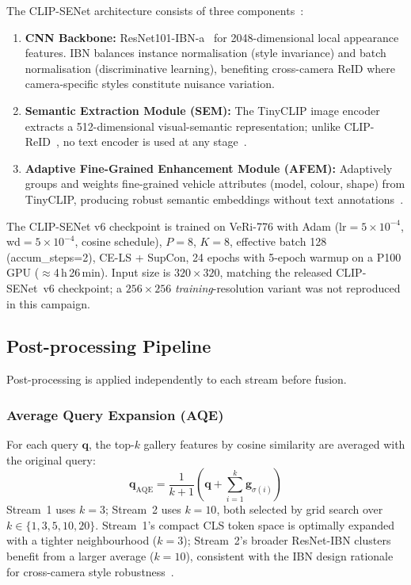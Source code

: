 \documentclass[11pt]{article}
\begin{document}
The CLIP-SENet architecture consists of three components~\cite{lu2025clipsenet}:
\begin{enumerate}
  \item \textbf{CNN Backbone:} ResNet101-IBN-a~\cite{pan2018ibn} for
    2048-dimensional local appearance features. IBN balances instance
    normalisation (style invariance) and batch normalisation (discriminative
    learning), benefiting cross-camera ReID where camera-specific styles
    constitute nuisance variation.
  \item \textbf{Semantic Extraction Module (SEM):} The TinyCLIP image encoder
    extracts a 512-dimensional visual-semantic representation; unlike
    CLIP-ReID~\cite{li2023clipreid}, no text encoder is used at any
    stage~\cite{lu2025clipsenet}.
  \item \textbf{Adaptive Fine-Grained Enhancement Module (AFEM):} Adaptively
    groups and weights fine-grained vehicle attributes (model, colour, shape)
    from TinyCLIP, producing robust semantic embeddings without text
    annotations~\cite{lu2025clipsenet}.
\end{enumerate}

The CLIP-SENet v6 checkpoint is trained on VeRi-776 with Adam
($\mathrm{lr}\!=\!5\!\times\!10^{-4}$, wd$=\!5\!\times\!10^{-4}$, cosine
schedule), $P\!=\!8$, $K\!=\!8$, effective batch 128 (accum\_steps=2), CE-LS
+ SupCon, 24 epochs with 5-epoch warmup on a P100 GPU ($\approx$4\,h\,26\,min).
Input size is $320\!\times\!320$, matching the released CLIP-SENet~v6
checkpoint; a $256\!\times\!256$ \emph{training}-resolution variant was not
reproduced in this campaign.

\subsection{Post-processing Pipeline}
Post-processing is applied independently to each stream before fusion.

\subsubsection{Average Query Expansion (AQE)~\cite{arandjelovic2012aqe}}
For each query $\mathbf{q}$, the top-$k$ gallery features by cosine similarity
are averaged with the original query:
\begin{equation}
  \mathbf{q}_{\mathrm{AQE}} =
    \frac{1}{k{+}1}\!\left(\mathbf{q} + \sum_{i=1}^{k} \mathbf{g}_{\sigma(i)}\right)
  \label{eq:aqe}
\end{equation}
Stream~1 uses $k{=}3$; Stream~2 uses $k{=}10$, both selected by grid search
over $k\in\{1,3,5,10,20\}$. Stream~1's compact CLS token space is optimally
expanded with a tighter neighbourhood ($k{=}3$); Stream~2's broader
ResNet-IBN clusters benefit from a larger average ($k{=}10$), consistent with
the IBN design rationale for cross-camera style robustness~\cite{pan2018ibn}.
\end{document}
